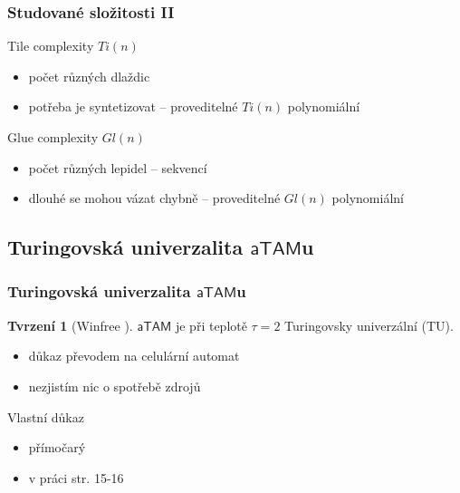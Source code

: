 \documentclass[10pt]{beamer}
\newcommand{\atam}{\mathsf{aTAM}}
\theoremstyle{definition}
\newtheorem{tvr}{Tvrzení}
\theoremstyle{remark}
\begin{document}
\begin{frame}
\frametitle{Studované složitosti II}
	Tile complexity $Ti(n)$
	\begin{itemize}
		\item počet různých dlaždic
		\item potřeba je syntetizovat -- proveditelné $Ti(n)$ polynomiální
	\end{itemize}
	Glue complexity $Gl(n)$
	\begin{itemize}
		\item počet různých lepidel -- sekvencí
		\item dlouhé se mohou vázat chybně -- proveditelné $Gl(n)$ polynomiální
	\end{itemize}
	\pause
\end{frame}

\subsection{Turingovská univerzalita $\atam$u}
\begin{frame}
\frametitle{Turingovská univerzalita $\atam$u}
	\begin{tvr}[Winfree \cite{winfree_phd}]
		$\atam$ je při teplotě $\tau=2$ Turingovsky univerzální (TU).
	\end{tvr}
	\begin{itemize}
		\item důkaz převodem na celulární automat
		\item nezjistím nic o spotřebě zdrojů
	\end{itemize}
	Vlastní důkaz
	\begin{itemize}
		\item přímočarý
		\item v práci str. 15-16
	\end{itemize}
\end{frame}
\end{document}
